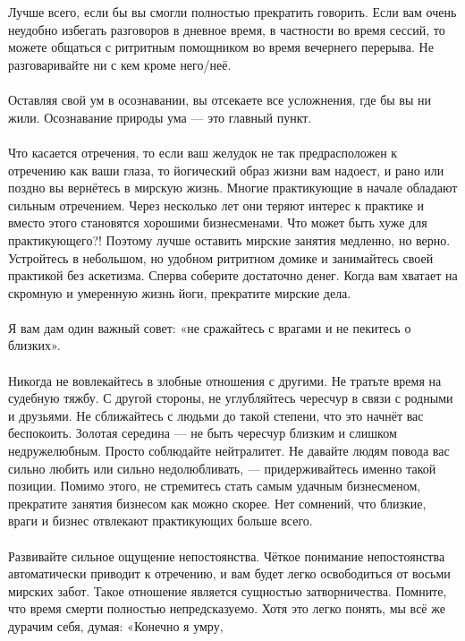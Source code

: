 \\ \\ Лучше всего, если бы вы смогли полностью прекратить говорить. Если вам очень неудобно избегать разговоров в дневное время, в частности во время сессий, то можете общаться с ритритным помощником во время вечернего перерыва. Не разговаривайте ни с кем кроме него/неё.
\\ \\ Оставляя свой ум в осознавании, вы отсекаете все усложнения, где бы вы ни жили. Осознавание природы ума — это главный пункт.
\\ \\ Что касается отречения, то если ваш желудок не так предрасположен к отречению как ваши глаза, то йогический образ жизни вам надоест, и рано или поздно вы вернётесь в мирскую жизнь. Многие практикующие в начале обладают сильным отречением. Через несколько лет они теряют интерес к практике и вместо этого становятся хорошими бизнесменами. Что может быть хуже для практикующего?! Поэтому лучше оставить мирские занятия медленно, но верно. Устройтесь в небольшом, но удобном ритритном домике и занимайтесь своей практикой без аскетизма. Сперва соберите достаточно денег. Когда вам хватает на скромную и умеренную жизнь йоги, прекратите мирские дела.
\\ \\ Я вам дам один важный совет: «не сражайтесь с врагами и не пекитесь о близких».
\\ \\ Никогда не вовлекайтесь в злобные отношения с другими. Не тратьте время на судебную тяжбу. С другой стороны, не углубляйтесь чересчур в связи с родными и друзьями. Не сближайтесь с людьми до такой степени, что это начнёт вас беспокоить. Золотая середина — не быть чересчур близким и слишком недружелюбным. Просто соблюдайте нейтралитет. Не давайте людям повода вас сильно любить или сильно недолюбливать, — придерживайтесь именно такой позиции. Помимо этого, не стремитесь стать самым удачным бизнесменом, прекратите занятия бизнесом как можно скорее. Нет сомнений, что близкие, враги и бизнес отвлекают практикую\-щих больше всего.
\\ \\ Развивайте сильное ощущение непостоянства.
      Чёткое понимание непостоянства автоматически приводит к отречению,
      и вам будет легко освободиться от восьми мирских забот.
      Такое отношение является сущностью затворничества.
      Помните, что время смерти полностью непредсказуемо.
      Хотя это легко понять, мы всё же дурачим себя, думая: «Конечно я умру,
